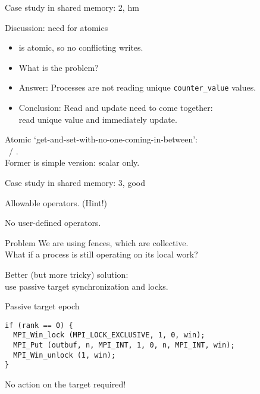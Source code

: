 \begin{numberedframe}{Case study in shared memory: 2, hm}
  \label{sl:fetchacc}
\end{numberedframe}

\begin{numberedframe}{Discussion: need for atomics}
  \label{sl:fetchop}
  \begin{itemize}
  \item {} is atomic, so no conflicting writes.
  \item What is the problem?
  \item Answer: Processes are not reading unique \lstinline+counter_value+ values.
  \item Conclusion: Read and update need to come together:\\
    read unique value and immediately update.
  \end{itemize}
  Atomic `get-and-set-with-no-one-coming-in-between':\\
  ~/ .\\
  Former is simple version: scalar only.
\end{numberedframe}


\begin{numberedframe}{Case study in shared memory: 3, good}
  \label{sl:fetchaccgood}
\end{numberedframe}

\begin{numberedframe}{Allowable operators. (Hint!)}
  

  No user-defined operators.
\end{numberedframe}

\begin{numberedframe}{Problem}
  We are using fences, which are collective.\\
  What if a process is still operating on its local work?

  Better (but more tricky) solution:\\
  use passive target synchronization and locks.
\end{numberedframe}

\begin{numberedframe}{Passive target epoch}
\begin{lstlisting}
if (rank == 0) {
  MPI_Win_lock (MPI_LOCK_EXCLUSIVE, 1, 0, win);
  MPI_Put (outbuf, n, MPI_INT, 1, 0, n, MPI_INT, win);
  MPI_Win_unlock (1, win);
}
\end{lstlisting}
No action on the target required!  
\end{numberedframe}

